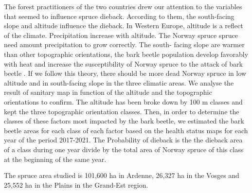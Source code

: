 \documentclass[3p,procedia]{elsarticle}
\begin{document}
The forest practitioners of the two countries drew our attention to the variables that seemed to influence spruce dieback.
According to them, the south-facing slope and altitude influence the dieback.
In Western Europe, altitude is a reflect of the climate.
Precipitation increase with altitude. 
The Norway spruce spruce need  amount precipitation to grow correctly.
The south- facing slope are warmer than other topographic orientations, the bark beetle 
population develop favorably with heat \citep{annila_influence_1969, baier_phenipscomprehensive_2007, jonsson_2009, marini_climate_2012} and increase the susceptibility of Norway spruce to the attack of bark beetle \citep{wermelinger_ecology_2004, netherer_waterlimiting_2015}.
If we follow this theory, there should be more dead Norway spruce in low altitude and in south-facing slope in the three climatic areas.  
We analyse the result of sanitary map in function of the altitude and the topographic orientations to confirm.
The altitude has been broke down  by 100 m classes and kept the three topographic orientation classes.
Then, in order to determine the classes of these factors most impacted by the bark beetle, we estimated the bark beetle areas for each class of each factor based on the health status maps for each year of the period 2017-2021.
The Probability of dieback is the the dieback area of a class during one year divide by the total area of Norway spruce of this class at the beginning of the same year. 

The spruce area studied is 101,600 ha in Ardenne, 26,327 ha in the Vosges and 25,552 ha in the Plains in the Grand-Est region.

  
			

\end{document}
